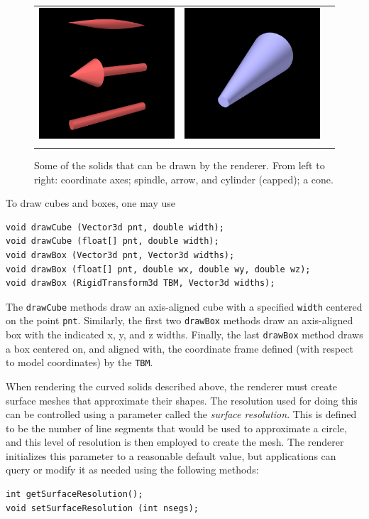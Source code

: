 \begin{figure}[ht]
\begin{center}
\begin{tabular}{ccc}
         \includegraphics[width=2in]{images/solidLines} &
         \includegraphics[width=2in]{images/solidCone}\\
      \fi
   \end{tabular}
\end{center}
\caption{Some of the solids that can be drawn by the renderer.  From
left to right: coordinate axes; spindle, arrow, and cylinder (capped);
a cone.}
\label{solids:fig}
\end{figure}

To draw cubes and boxes, one may use
%
\begin{lstlisting}[]
void drawCube (Vector3d pnt, double width);
void drawCube (float[] pnt, double width);
void drawBox (Vector3d pnt, Vector3d widths);
void drawBox (float[] pnt, double wx, double wy, double wz);
void drawBox (RigidTransform3d TBM, Vector3d widths);
\end{lstlisting}
%
The {\tt drawCube} methods draw an axis-aligned cube with a specified
{\tt width} centered on the point {\tt pnt}. Similarly, the first two
{\tt drawBox} methods draw an axis-aligned box with the indicated x,
y, and z widths. Finally, the last {\tt drawBox} method draws a box
centered on, and aligned with, the coordinate frame defined (with
respect to model coordinates) by the 
 {\tt TBM}.

When rendering the curved solids described above, the renderer must
create surface meshes that approximate their shapes. The resolution
used for doing this can be controlled using a parameter called the
{\it surface resolution}. This is defined to be the number of line
segments that would be used to approximate a circle, and this level of
resolution is then employed to create the mesh. The renderer
initializes this parameter to a reasonable default value, but
applications can query or modify it as needed using the following
methods:
%
\begin{lstlisting}[]
int getSurfaceResolution();
void setSurfaceResolution (int nsegs);
\end{lstlisting}
%


